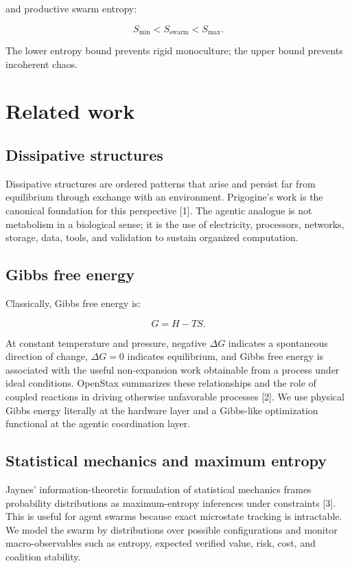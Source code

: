 and productive swarm entropy:

\[
S_{\min}<S_{\text{swarm}}<S_{\max}.
\]

The lower entropy bound prevents rigid monoculture; the upper bound
prevents incoherent chaos.

\section{Related work}\label{related-work}

\subsection{Dissipative structures}\label{dissipative-structures}

Dissipative structures are ordered patterns that arise and persist far
from equilibrium through exchange with an environment. Prigogine's work
is the canonical foundation for this perspective {[}1{]}. The agentic
analogue is not metabolism in a biological sense; it is the use of
electricity, processors, networks, storage, data, tools, and validation
to sustain organized computation.

\subsection{Gibbs free energy}\label{gibbs-free-energy}

Classically, Gibbs free energy is:

\[
G=H-TS.
\]

At constant temperature and pressure, negative \(\Delta G\) indicates a
spontaneous direction of change, \(\Delta G=0\) indicates equilibrium,
and Gibbs free energy is associated with the useful non-expansion work
obtainable from a process under ideal conditions. OpenStax summarizes
these relationships and the role of coupled reactions in driving
otherwise unfavorable processes {[}2{]}. We use physical Gibbs energy
literally at the hardware layer and a Gibbs-like optimization functional
at the agentic coordination layer.

\subsection{Statistical mechanics and maximum
entropy}\label{statistical-mechanics-and-maximum-entropy}

Jaynes' information-theoretic formulation of statistical mechanics
frames probability distributions as maximum-entropy inferences under
constraints {[}3{]}. This is useful for agent swarms because exact
microstate tracking is intractable. We model the swarm by distributions
over possible configurations and monitor macro-observables such as
entropy, expected verified value, risk, cost, and coalition stability.

